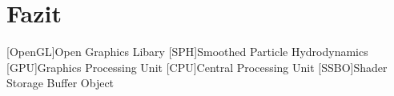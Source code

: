 \documentclass[intern,palatino]{cgBA}
\begin{document}
\section{Fazit}


\begin{acronym}
	[OpenGL]{Open Graphics Libary}
	[SPH]{Smoothed Particle Hydrodynamics}
	[GPU]{Graphics Processing Unit}
	[CPU]{Central Processing Unit}
	[SSBO]{Shader Storage Buffer Object}
\end{acronym}


\newpage

\end{document}
